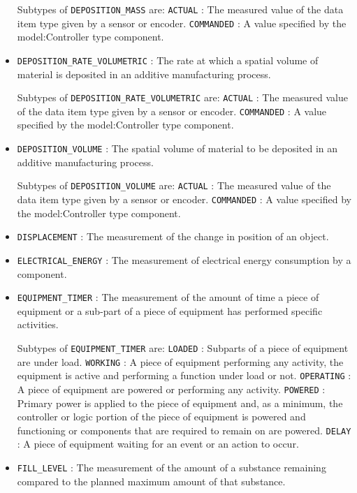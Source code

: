 \begin{itemize}
Subtypes of \texttt{DEPOSITION_MASS} are: 
\newline\tab \texttt{ACTUAL} : The measured value of the data item type given by a sensor or encoder. 
\newline\tab \texttt{COMMANDED} : A value specified by the {model:Controller} type component. 
\item \texttt{DEPOSITION_RATE_VOLUMETRIC} : The rate at which a spatial volume of material is deposited in an additive manufacturing process. 

Subtypes of \texttt{DEPOSITION_RATE_VOLUMETRIC} are: 
\newline\tab \texttt{ACTUAL} : The measured value of the data item type given by a sensor or encoder. 
\newline\tab \texttt{COMMANDED} : A value specified by the {model:Controller} type component. 
\item \texttt{DEPOSITION_VOLUME} : The spatial volume of material to be deposited in an additive manufacturing process. 

Subtypes of \texttt{DEPOSITION_VOLUME} are: 
\newline\tab \texttt{ACTUAL} : The measured value of the data item type given by a sensor or encoder. 
\newline\tab \texttt{COMMANDED} : A value specified by the {model:Controller} type component. 
\item \texttt{DISPLACEMENT} : The measurement of the change in position of an object. 

\item \texttt{ELECTRICAL_ENERGY} : The measurement of electrical energy consumption by a component. 

\item \texttt{EQUIPMENT_TIMER} : The measurement of the amount of time a piece of equipment or a sub-part of a piece of equipment has performed specific activities. 

Subtypes of \texttt{EQUIPMENT_TIMER} are: 
\newline\tab \texttt{LOADED} : Subparts of a piece of equipment are under load. 
\newline\tab \texttt{WORKING} : A piece of equipment performing any activity, the equipment is active and performing a function under load or not. 
\newline\tab \texttt{OPERATING} : A piece of equipment are powered or performing any activity. 
\newline\tab \texttt{POWERED} : Primary  power is  applied  to the  piece  of  equipment and,  as  a minimum, the controller or logic portion of the piece of equipment is powered and functioning or components that are required to remain on are powered. 
\newline\tab \texttt{DELAY} : A piece of equipment waiting for an event or an action to occur. 
\item \texttt{FILL_LEVEL} : The measurement of the amount of a substance remaining compared to the planned maximum amount of that substance. 


\end{itemize}
